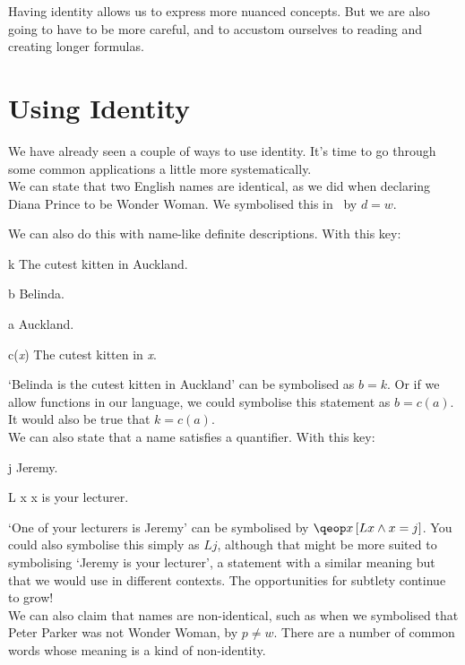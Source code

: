 \documentclass[PHIL101-Textbook.tex]{subfiles}
\begin{document}
Having identity allows us to express more nuanced concepts. But we are also going to have to be more careful, and to accustom ourselves to reading and creating longer formulas.



\section{Using Identity} 

We have already seen a couple of ways to use identity. It's time to go through some common applications a little more systematically.\\

We can state that two English names are identical, as we did when declaring Diana Prince to be Wonder Woman. We symbolised this in \pl\ by $d=w$.

We can also do this with name-like definite descriptions. With this key:

\begin{ekey}
\item[k] The cutest kitten in Auckland.
\item[b] Belinda.
\item[a] Auckland.
\item[c(\textit{x})] The cutest kitten in \textit{x}.
\end{ekey}
`Belinda is  the cutest kitten in Auckland' can be symbolised as $b = k$. Or if we allow functions in our language, we could symbolise this statement as $b = c(a)$. It would also be true that $k = c(a)$.\\

We can also state that a name satisfies a quantifier.  With this key:

\begin{ekey}
\item[j] Jeremy.
\item[L x] x is your lecturer.
\end{ekey}
`One of your lecturers is Jeremy' can be symbolised by $\qeb{x}{Lx \eand x = j}$. You could also symbolise this simply as $Lj$, although that might be more suited to symbolising `Jeremy is your lecturer', a statement with a similar meaning but that we would use in different contexts. The opportunities for subtlety continue to grow!\\


We can also claim that names are non-identical, such as when we symbolised that Peter Parker was not Wonder Woman, by $p\neq w$. There are a number of common words whose meaning is a kind of non-identity. 
\end{document}
